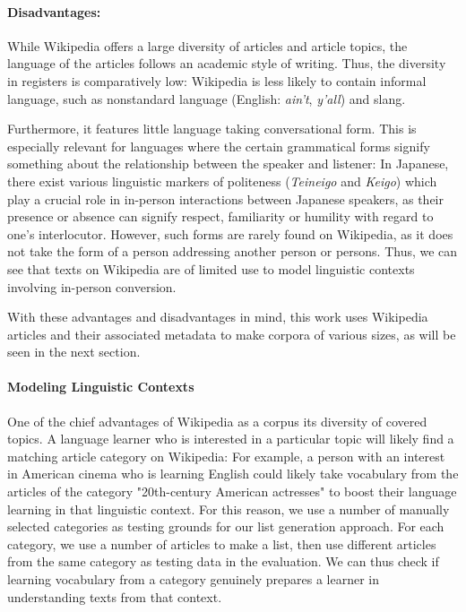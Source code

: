 \paragraph{Disadvantages:}
While Wikipedia offers a large diversity of articles and article topics, the language of the articles follows an academic style of writing.
Thus, the diversity in registers is comparatively low:
Wikipedia is less likely to contain informal language, such as nonstandard language (English: \textit{ain't}, \textit{y'all}) and slang.

Furthermore, it features little language taking conversational form.
This is especially relevant for languages where the certain grammatical forms signify something about the relationship between the speaker and listener:
In Japanese, there exist various linguistic markers of politeness (\textit{Teineigo} and \textit{Keigo}) which play a crucial role in in-person interactions between Japanese speakers, as their presence or absence can signify respect, familiarity or humility with regard to one's interlocutor.
However, such forms are rarely found on Wikipedia, as it does not take the form of a person addressing another person or persons.
Thus, we can see that texts on Wikipedia are of limited use to model linguistic contexts involving in-person conversion.

With these advantages and disadvantages in mind, this work uses Wikipedia articles and their associated metadata to make corpora of various sizes, as will be seen in the next section.

\paragraph{Modeling Linguistic Contexts}

One of the chief advantages of Wikipedia as a corpus its diversity of covered topics.
A language learner who is interested in a particular topic will likely find a matching article category on Wikipedia:
For example, a person with an interest in American cinema who is learning English could likely take vocabulary from the articles of the category "20th-century American actresses" to boost their language learning in that linguistic context.
For this reason, we use a number of manually selected categories as testing grounds for our list generation approach.
For each category, we use a number of articles to make a list, then use different articles from the same category as testing data in the evaluation.
We can thus check if learning vocabulary from a category genuinely prepares a learner in understanding texts from that context.

